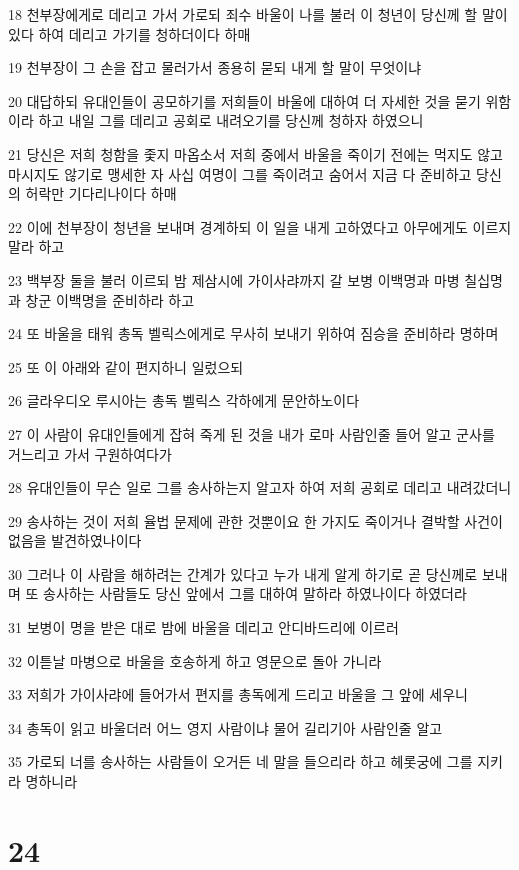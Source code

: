 \par 18 천부장에게로 데리고 가서 가로되 죄수 바울이 나를 불러 이 청년이 당신께 할 말이 있다 하여 데리고 가기를 청하더이다 하매
\par 19 천부장이 그 손을 잡고 물러가서 종용히 묻되 내게 할 말이 무엇이냐
\par 20 대답하되 유대인들이 공모하기를 저희들이 바울에 대하여 더 자세한 것을 묻기 위함이라 하고 내일 그를 데리고 공회로 내려오기를 당신께 청하자 하였으니
\par 21 당신은 저희 청함을 좇지 마옵소서 저희 중에서 바울을 죽이기 전에는 먹지도 않고 마시지도 않기로 맹세한 자 사십 여명이 그를 죽이려고 숨어서 지금 다 준비하고 당신의 허락만 기다리나이다 하매
\par 22 이에 천부장이 청년을 보내며 경계하되 이 일을 내게 고하였다고 아무에게도 이르지 말라 하고
\par 23 백부장 둘을 불러 이르되 밤 제삼시에 가이사랴까지 갈 보병 이백명과 마병 칠십명과 창군 이백명을 준비하라 하고
\par 24 또 바울을 태워 총독 벨릭스에게로 무사히 보내기 위하여 짐승을 준비하라 명하며
\par 25 또 이 아래와 같이 편지하니 일렀으되
\par 26 글라우디오 루시아는 총독 벨릭스 각하에게 문안하노이다
\par 27 이 사람이 유대인들에게 잡혀 죽게 된 것을 내가 로마 사람인줄 들어 알고 군사를 거느리고 가서 구원하여다가
\par 28 유대인들이 무슨 일로 그를 송사하는지 알고자 하여 저희 공회로 데리고 내려갔더니
\par 29 송사하는 것이 저희 율법 문제에 관한 것뿐이요 한 가지도 죽이거나 결박할 사건이 없음을 발견하였나이다
\par 30 그러나 이 사람을 해하려는 간계가 있다고 누가 내게 알게 하기로 곧 당신께로 보내며 또 송사하는 사람들도 당신 앞에서 그를 대하여 말하라 하였나이다 하였더라
\par 31 보병이 명을 받은 대로 밤에 바울을 데리고 안디바드리에 이르러
\par 32 이튿날 마병으로 바울을 호송하게 하고 영문으로 돌아 가니라
\par 33 저희가 가이사랴에 들어가서 편지를 총독에게 드리고 바울을 그 앞에 세우니
\par 34 총독이 읽고 바울더러 어느 영지 사람이냐 물어 길리기아 사람인줄 알고
\par 35 가로되 너를 송사하는 사람들이 오거든 네 말을 들으리라 하고 헤롯궁에 그를 지키라 명하니라

\chapter{24}

